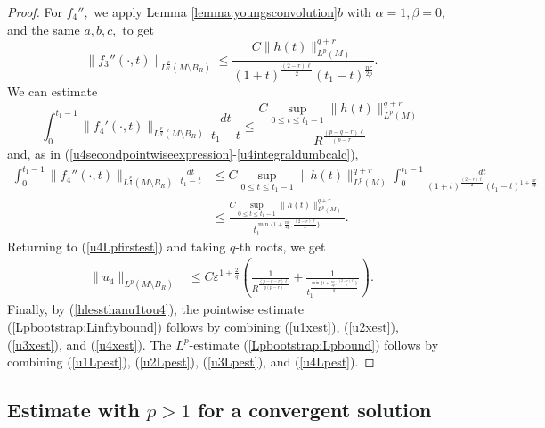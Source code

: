 \documentclass[12pt]{amsart}
\renewcommand{\1}{{\mathbf 1}}
\newcommand{\eps}{{\varepsilon}}
\theoremstyle{others}
\numberwithin{equation}{section}
\begin{document}
\begin{proof}
    For $f_4'',$ we apply Lemma \ref{lemma:youngsconvolution}$b$ with $\alpha = 1, \beta = 0,$ and the same $a,b,c,$ to get
    $$\|f_3''(\cdot, t) \|_{L^{\frac{p}{q}}(M \setminus B_R)} \leq \frac{C \|h(t) \|_{L^p(M)}^{q + r} }{ (1 + t)^{\frac{(2 - r)\ell}{2}} (t_1 - t)^{\frac{n r}{2p} }  } .$$
    We can estimate
    $$\int_{0}^{t_1 - 1} \|f_4'(\cdot, t) \|_{L^{\frac{p}{q}}(M \setminus B_R)}   \, \frac{dt}{t_1 - t } \leq \frac{C \sup_{0 \leq t \leq t_1 - 1} \|h(t) \|_{L^p(M)}^{q + r} }{ R^{ \frac{ \left( p - q - r \right) \ell}{(p-r)} } }$$
    and, as in (\ref{u4secondpointwiseexpression}-\ref{u4integraldumbcalc}),
    \begin{equation*}
        \begin{split}\int_{0}^{t_1 - 1} \|f_4''(\cdot, t) \|_{L^{\frac{p}{q}}(M \setminus B_R)} \, \frac{dt}{t_1 - t } & \leq C \sup_{0 \leq t \leq t_1 - 1} \|h(t) \|_{L^p(M)}^{q + r} \int_0^{t_1 - 1} \frac{dt}{ (1 + t)^{\frac{(2 - r)\ell}{2}} (t_1 - t)^{1 + \frac{n r}{2p} }  } \\
        & \leq \frac{C \sup_{0 \leq t \leq t_1 - 1} \|h(t) \|_{L^p(M)}^{q + r} }{t_1^{\min\{1 + \frac{n r}{2p} , \frac{(2 - r)\ell}{2} \}}}.
        \end{split}
        \end{equation*}
        Returning to (\ref{u4Lpfirstest}) and taking $q$-th roots, we get
        \begin{equation}\label{u4Lpest}
     \begin{split}
        \| u_4\|_{L^{p}(M \setminus B_R)} & \leq C \eps^{1 + \frac{2}{q}} \left( \frac{1}{R^{ \frac{ \left( p - q - r \right) \ell}{q(p-r)} }} + \frac{1}{t_1^{\frac{\min\{1 + \frac{nr}{2p} , \frac{(2 - r)\ell}{2} \} }{q} } } \right).
        \end{split}
    \end{equation}
Finally, by (\ref{hlessthanu1tou4}), the pointwise estimate (\ref{Lpbootstrap:Linftybound}) follows by combining (\ref{u1xest}), (\ref{u2xest}), (\ref{u3xest}), and (\ref{u4xest}). The $L^p$-estimate (\ref{Lpbootstrap:Lpbound}) follows by combining (\ref{u1Lpest}), (\ref{u2Lpest}), (\ref{u3Lpest}), and (\ref{u4Lpest}).
\end{proof}
    



\vspace{2mm}




\subsection{Estimate with $p > 1$ for a convergent solution}\label{ss:smallpproofofLpprop}
\end{document}
